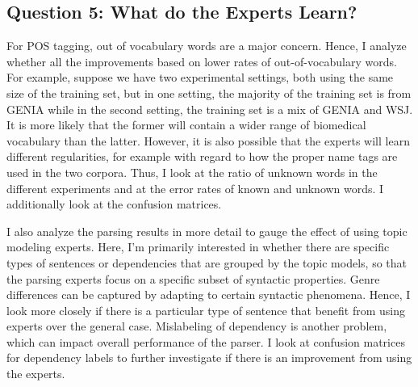 \subsection*{Question 5: What do the Experts Learn?}


For POS tagging, out of vocabulary words are a major concern. Hence, I analyze whether all the improvements based on lower rates of out-of-vocabulary words. For example, suppose we have two experimental settings, both using the same size of the training set, but in one setting, the majority of the training set is from GENIA while in the second setting, the training set is a mix of GENIA and WSJ. It is more likely that the former will contain a wider range of biomedical vocabulary than the latter. However, it is also possible that the experts will learn different regularities, for example with regard to how the proper name tags are used in the two corpora. Thus, I look at the ratio of unknown words in the different experiments and at the error rates of known and unknown words. I additionally look at the confusion matrices.

I also analyze the parsing results in more detail to gauge the effect of using topic modeling experts. Here, I'm primarily interested in whether there are specific types of sentences or dependencies that are grouped by the topic models, so that the parsing experts focus on a specific subset of syntactic properties. Genre differences can be captured by adapting to certain syntactic phenomena. Hence, I look more closely if there is a particular type of sentence that benefit from using experts over the general case. Mislabeling of dependency is another problem, which can impact overall performance of the parser. I look at confusion matrices for dependency labels to further investigate if there is an improvement from using the experts. 

